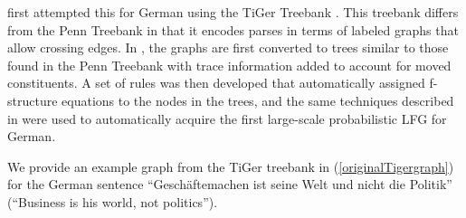 \documentclass[output=paper,hidelinks]{langscibook}
\begin{document}
\citet{Cahilletal:03b} first attempted this for German using the TiGer Treebank \citep{Brants02tlt}. This treebank differs from the Penn Treebank in that it encodes parses in terms of labeled graphs that allow crossing edges. In \citet{Cahilletal:03b}, the graphs are first converted to trees similar to those found in the Penn Treebank with trace information added to account for moved constituents. A set of rules was then developed that automatically assigned f-structure equations to the nodes in the trees, and the same techniques described in \citet{cahilletal02} were used to automatically acquire the first large-scale probabilistic LFG for German.  


We provide an example graph from the TiGer treebank in
(\ref{originalTigergraph})
 for the German sentence ``Gesch\"aftemachen ist seine Welt und nicht die Politik'' (``Business is his world, not politics'').
\end{document}
